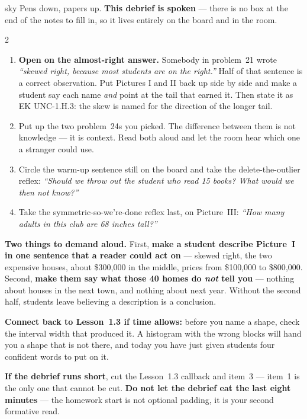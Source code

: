\documentclass[10pt]{article}
\begin{document}
\boxguard
\begin{skillbox}{sky}
Pens down, papers up. \textbf{This debrief is spoken} --- there is no box at the end of the
notes to fill in, so it lives entirely on the board and in the room.
\begin{multicols}{2}
\begin{enumerate}[leftmargin=1.3em, nosep, itemsep=3pt]
  \item \textbf{Open on the almost-right answer.} Somebody in problem~21 wrote
        \emph{``skewed right, because most students are on the right.''} Half of that sentence
        is a correct observation. Put Pictures I and II back up side by side and make a student
        say each name \emph{and} point at the tail that earned it. Then state it as
        EK UNC-1.H.3: the skew is named for the direction of the longer tail.
  \item Put up the two problem~24s you picked. The difference between them is not
        knowledge --- it is context. Read both aloud and let the room hear which one a stranger
        could use.
  \item Circle the warm-up sentence still on the board and take the delete-the-outlier reflex:
        \emph{``Should we throw out the student who read 15 books? What would we then not
        know?''}
  \item Take the symmetric-so-we're-done reflex last, on Picture~III: \emph{``How many adults in
        this club are 68 inches tall?''}
\end{enumerate}
\columnbreak
\textbf{Two things to demand aloud.} First, \textbf{make a student describe Picture~I in one
sentence that a reader could act on} --- skewed right, the two expensive houses, about
\$300{,}000 in the middle, prices from \$100{,}000 to \$800{,}000. Second, \textbf{make them say
what those 40 homes do \emph{not} tell you} --- nothing about houses in the next town, and
nothing about next year. Without the second half, students leave believing a description is a
conclusion.

\textbf{Connect back to Lesson~1.3 if time allows:} before you name a shape, check the interval
width that produced it. A histogram with the wrong blocks will hand you a shape that is not
there, and today you have just given students four confident words to put on it.

\textbf{If the debrief runs short}, cut the Lesson~1.3 callback and item~3 --- item~1 is the
only one that cannot be cut. \textbf{Do not let the debrief eat the last eight minutes} --- the
homework start is not optional padding, it is your second formative read.
\end{multicols}
\end{skillbox}
\end{document}
